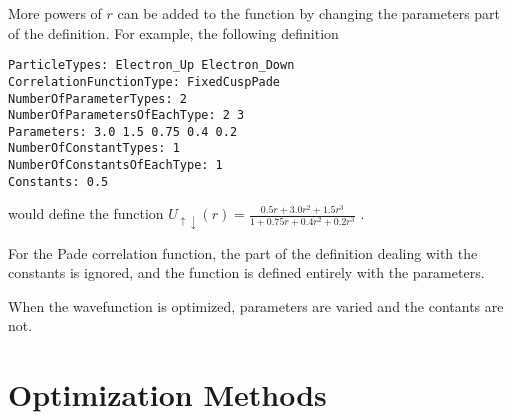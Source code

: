 \documentclass{article}
\begin{document}
More powers of $r$ can be added to the function by changing the
parameters part of the definition.  For example, the following
definition
\begin{verbatim}
ParticleTypes: Electron_Up Electron_Down
CorrelationFunctionType: FixedCuspPade
NumberOfParameterTypes: 2
NumberOfParametersOfEachType: 2 3
Parameters: 3.0 1.5 0.75 0.4 0.2
NumberOfConstantTypes: 1
NumberOfConstantsOfEachType: 1
Constants: 0.5
\end{verbatim}
would define the function 
\(
U_{\uparrow \downarrow}(r)
=\frac{0.5r+3.0r^{2}+1.5r^{3}}{1+0.75r+0.4r^{2}+0.2r^{3}}
\)
.  

For the Pade correlation function, the part of the definition dealing
with the constants is ignored, and the function is defined entirely
with the parameters.

When the wavefunction is optimized, parameters are varied and the
contants are not.  

\section{Optimization Methods}
\end{document}
